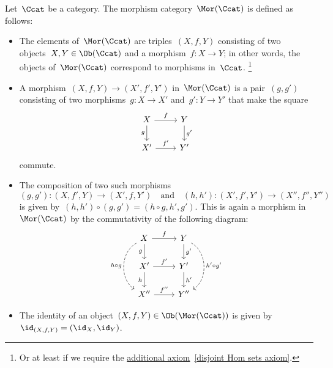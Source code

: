 \begin{example*}
  \label{morphism category}
  Let~$\Ccat$ be a category.
  The morphism category~$\Mor(\Ccat)$ is defined as follows:
  \begin{itemize}
    \item 
      The elements of~$\Mor(\Ccat)$ are triples~$(X,f,Y)$ consisting of two objects~$X, Y \in \Ob(\Ccat)$ and a morphism~$f \colon X \to Y$;
      in other words, the objects of~$\Mor(\Ccat)$ correspond to morphisms in~$\Ccat$.%
      \footnote{Or at least if we require the \hyperref[disjoint Hom sets]{additional axiom}~\ref*{disjoint Hom sets axiom}.}
    \item
      A morphism~$(X, f, Y) \to (X', f', Y')$ in~$\Mor(\Ccat)$ is a pair~$(g, g')$ consisting of two morphisms~$g \colon X \to X'$ and~$g' \colon Y \to Y'$ that make the square
      \[
        \begin{tikzcd}
            X
            \arrow{r}[above]{f}
            \arrow{d}[left]{g}
          & Y
            \arrow{d}[right]{g'}
          \\
            X'
            \arrow{r}[above]{f'}
          & Y'
        \end{tikzcd}
      \]
      commute.
    \item
      The composition of two such morphisms
      \[
                (g,g')
        \colon  (X,f',Y)
        \to     (X',f,Y')
        \quad\text{and}\quad
                (h,h')
        \colon  (X',f',Y')
        \to     (X'',f'',Y'')
      \]
      is given by~$(h,h') \circ (g,g') = (h \circ g, h', g')$.
      This is again a morphism in~$\Mor(\Ccat)$ by the commutativity of the following diagram:
      \[
        \begin{tikzcd}
            X
            \arrow{r}[above]{f}
            \arrow{d}[left]{g}
            \arrow[dashed, bend right = 60]{dd}[left]{h \circ g}
          & Y
            \arrow{d}[right]{g'}
            \arrow[dashed, bend left = 60]{dd}[right]{h' \circ g'}
          \\
            X'
            \arrow{r}[above]{f'}
            \arrow{d}[left]{h}
          & Y'
            \arrow{d}[right]{h'}
          \\
            X''
            \arrow{r}[above]{f''}
          & Y''
        \end{tikzcd}
      \]
    \item
      The identity of an object~$(X,f,Y) \in \Ob(\Mor(\Ccat))$ is given by~$\id_{(X,f,Y)} = (\id_X, \id_Y)$.
  \end{itemize}
\end{example*}


